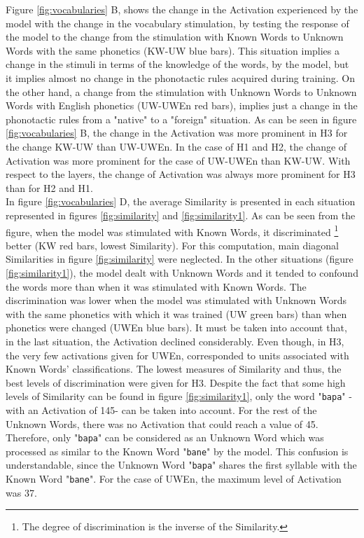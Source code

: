 \documentclass[11pt,a4paper]{article}
\begin{document}
Figure \ref{fig:vocabularies} B, shows the change in the Activation experienced by the model
with the change in the vocabulary stimulation,
by testing the response of the model to the change from the stimulation with Known Words to Unknown Words
with the same phonetics (KW-UW blue bars).
This situation implies a change in the stimuli in terms of the knowledge of the words, by the model,
but it implies almost no change
in the phonotactic rules acquired during training.
On the other hand, a change from the stimulation with Unknown Words to Unknown Words with English phonetics
(UW-UWEn red bars), implies just a change in the phonotactic rules from a "native" to a "foreign" situation.
As can be seen in figure \ref{fig:vocabularies} B, the change in the Activation was more prominent in
H3 for the change KW-UW than UW-UWEn.
In the case of H1 and H2, the change of Activation was more prominent for the case of UW-UWEn than KW-UW.
With respect to the layers, the change of Activation was always more prominent for H3 than for H2 and H1.\\

In figure \ref{fig:vocabularies} D, the average Similarity is presented in each situation represented 
in figures \ref{fig:similarity} and \ref{fig:similarity1}.
As can be seen from the figure, when the model was stimulated with Known Words, it discriminated
\footnote{The degree of discrimination is the inverse of the Similarity.} better (KW red bars, lowest Similarity).
For this computation, main diagonal Similarities in figure \ref{fig:similarity} were neglected.
In the other situations (figure \ref{fig:similarity1}), the model dealt with Unknown Words and
it tended to confound the words more than when it was stimulated with Known Words.
The discrimination was lower when the model was stimulated with Unknown Words with the same
phonetics with which it was trained (UW green bars) than when phonetics were changed (UWEn blue bars).
It must be taken into account that, in the last situation, the Activation declined considerably.
Even though, in H3, the very few activations given for UWEn, corresponded to units
associated with Known Words' classifications.
The lowest measures of Similarity and thus, the best levels of discrimination were given for H3.
Despite the fact that some high levels of Similarity can be found in figure \ref{fig:similarity1},
only the word "\texttt{bapa}" -with an Activation of 145- can be taken into account.
For the rest of the Unknown Words, there was no Activation that could reach a value of 45.
Therefore, only "\texttt{bapa}" can be considered as an Unknown Word which
was processed as similar to the Known Word "\texttt{bane}" by the model.
This confusion is understandable, since the Unknown Word "\texttt{bapa}" shares
the first syllable with the Known Word "\texttt{bane}".
For the case of UWEn, the maximum level of Activation was 37.\\
\end{document}
